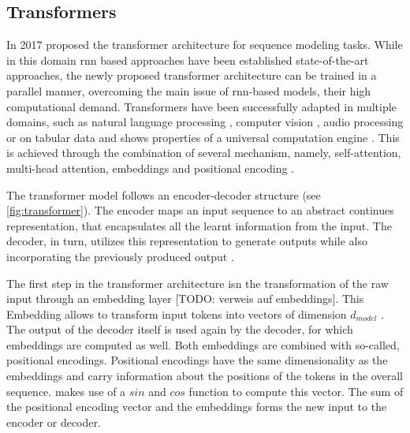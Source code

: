\subsection{Transformers}
\label{ch:preliminaries-generativeAlgorithms-transformers}

In 2017 \cite{vaswani2017AttentionAllYou} proposed the transformer architecture for sequence modeling tasks.
While in this domain \gls{rnn} based approaches have been established state-of-the-art approaches, the newly proposed transformer architecture can be trained in a parallel manner,
overcoming the main issue of \gls{rnn}-based models, their high computational demand.
Transformers have been successfully adapted in multiple domains, such as natural language processing \cite{gillioz2020OverviewTransformerbasedModels}, computer vision \cite{khan2022TransformersVisionSurvey}, audio processing \cite{gong2022SSASTSelfSupervisedAudio} or on tabular data \cite{huang2020TabTransformerTabularData} 
and shows properties of a universal computation engine \cite{lu2021PretrainedTransformersUniversal, lin2022SurveyTransformers}.
This is achieved through the combination of several mechanism, namely, self-attention, multi-head attention, embeddings and positional encoding \cite{vaswani2017AttentionAllYou}.

The transformer model follows an encoder-decoder structure (see \autoref{fig:transformer}).
The encoder maps an input sequence to an abstract continues representation, that encapsulates all the learnt information from the input.
The decoder, in turn, utilizes this representation to generate outputs while also incorporating the previously produced output \cite{vaswani2017AttentionAllYou}.

The first step in the transformer architecture isn the transformation of the raw input through an embedding layer [TODO: verweis auf embeddings].
This Embedding allows to transform input tokens into vectors of dimension $d_{model}$ \cite{vaswani2017AttentionAllYou}.
The output of the decoder itself is used again by the decoder, for which embeddings are computed as well.
Both embeddings are combined with so-called, positional encodings.
Positional encodings have the same dimensionality as the embeddings and carry information about the positions of the tokens in the overall sequence.
\cite{vaswani2017AttentionAllYou} makes use of a $sin$ and $cos$ function to compute this vector.
The sum of the positional encoding vector and the embeddings forms the new input to the encoder or decoder.


